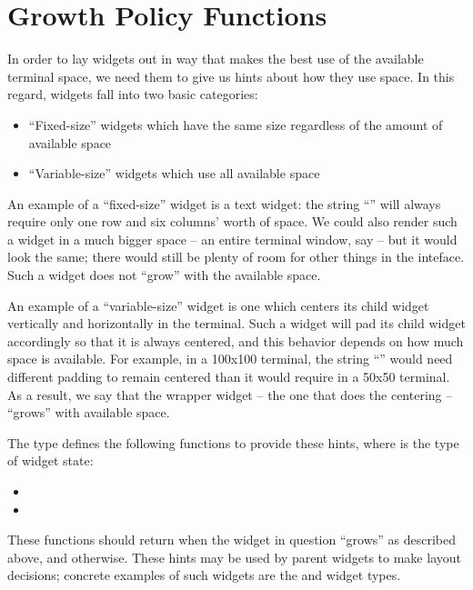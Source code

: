 \section{Growth Policy Functions}
\label{sec:growth_policy_functions}

In order to lay widgets out in way that makes the best use of the
available terminal space, we need them to give us hints about how they
use space.  In this regard, widgets fall into two basic categories:

\begin{itemize}
\item ``Fixed-size'' widgets which have the same size regardless of
  the amount of available space
\item ``Variable-size'' widgets which use all available space
\end{itemize}

An example of a ``fixed-size'' widget is a text widget: the string
``'' will always require only one row and six columns'
worth of space.  We could also render such a widget in a much bigger
space -- an entire terminal window, say -- but it would look the same;
there would still be plenty of room for other things in the inteface.
Such a widget does not ``grow'' with the available space.

An example of a ``variable-size'' widget is one which centers its
child widget vertically and horizontally in the terminal.  Such a
widget will pad its child widget accordingly so that it is always
centered, and this behavior depends on how much space is available.
For example, in a 100x100 terminal, the string ``'' would
need different padding to remain centered than it would require in a
50x50 terminal.  As a result, we say that the wrapper widget -- the
one that does the centering -- ``grows'' with available space.

The  type defines the following functions to provide
these hints, where  is the type of widget state:

\begin{itemize}
\item {}
\item {}
\end{itemize}

These functions should return  when the widget in question
``grows'' as described above, and  otherwise.  These hints
may be used by parent widgets to make layout decisions; concrete
examples of such widgets are the  and  widget
types.

